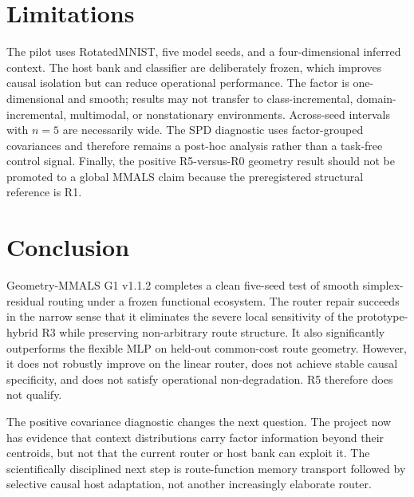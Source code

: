 \documentclass[11pt,a4paper]{article}
\begin{document}
\section{Limitations}
The pilot uses RotatedMNIST, five model seeds, and a four-dimensional inferred context. The host bank and classifier are deliberately frozen, which improves causal isolation but can reduce operational performance. The factor is one-dimensional and smooth; results may not transfer to class-incremental, domain-incremental, multimodal, or nonstationary environments. Across-seed intervals with $n=5$ are necessarily wide. The SPD diagnostic uses factor-grouped covariances and therefore remains a post-hoc analysis rather than a task-free control signal. Finally, the positive R5-versus-R0 geometry result should not be promoted to a global MMALS claim because the preregistered structural reference is R1.

\section{Conclusion}
Geometry-MMALS G1 v1.1.2 completes a clean five-seed test of smooth simplex-residual routing under a frozen functional ecosystem. The router repair succeeds in the narrow sense that it eliminates the severe local sensitivity of the prototype-hybrid R3 while preserving non-arbitrary route structure. It also significantly outperforms the flexible MLP on held-out common-cost route geometry. However, it does not robustly improve on the linear router, does not achieve stable causal specificity, and does not satisfy operational non-degradation. R5 therefore does not qualify.

The positive covariance diagnostic changes the next question. The project now has evidence that context distributions carry factor information beyond their centroids, but not that the current router or host bank can exploit it. The scientifically disciplined next step is route-function memory transport followed by selective causal host adaptation, not another increasingly elaborate router.

\appendix
\end{document}
